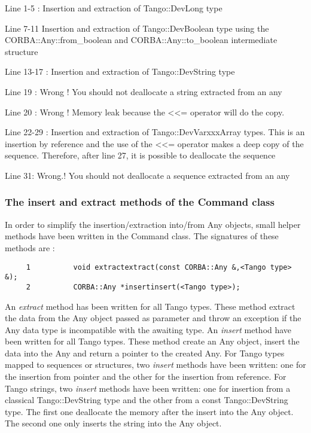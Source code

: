 Line 1-5 : Insertion and extraction of Tango::DevLong type

Line 7-11 Insertion and extraction of Tango::DevBoolean type using
the CORBA::Any::from\_boolean and CORBA::Any::to\_boolean intermediate
structure

Line 13-17 : Insertion and extraction of Tango::DevString type

Line 19 : Wrong ! You should not deallocate a string extracted from
an any

Line 20 : Wrong ! Memory leak because the <\textcompwordmark{}<= operator
will do the copy. 

Line 22-29 : Insertion and extraction of Tango::DevVarxxxArray types.
This is an insertion by reference and the use of the <\textcompwordmark{}<=
operator makes a deep copy of the sequence. Therefore, after line
27, it is possible to deallocate the sequence

Line 31: Wrong.! You should not deallocate a sequence extracted from
an any


\subsubsection{The insert and extract methods of the Command class}

In order to simplify the insertion/extraction into/from Any
objects, small helper methods have been written in the Command
class. The signatures of these methods are :


\begin{verbatim}
     1          void extractextract(const CORBA::Any &,<Tango type> &);
     2          CORBA::Any *insertinsert(<Tango type>);
\end{verbatim}


An \emph{extract} method has been written for all Tango types. These
method extract the data from the Any object passed as parameter and
throw an exception if the Any data type is incompatible with the awaiting
type. An \emph{insert} method have been written for all Tango types.
These method create an Any object, insert the data into the Any and
return a pointer to the created Any. For Tango types mapped to sequences
or structures, two \emph{insert} methods have been written: one for
the insertion from pointer and the other for the insertion from reference.
For Tango strings, two \emph{insert} methods have been written: one
for insertion from a classical Tango::DevString type and the other
from a const Tango::DevString type. The first one deallocate the memory
after the insert into the Any object. The second one only inserts
the string into the Any object. 

